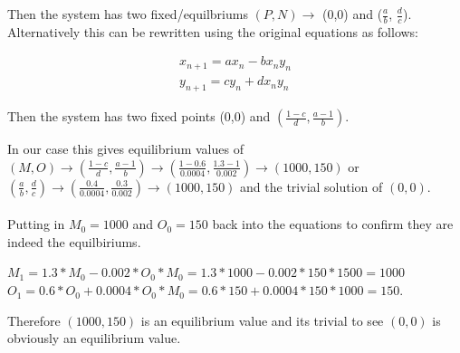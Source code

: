 \documentclass{article}
\begin{document}
\begin{enumerate}[1.]
\begin{enumerate}[(a)]
Then the system has two fixed/equilbriums $(P,N) \to$ (0,0) and ($\frac{a}{b}$, $\frac{d}{c}$). Alternatively this can be rewritten using the original equations as follows:

\begin{gather*}
x_{n+1} = ax_n-bx_ny_n \\
y_{n+1} = cy_n + dx_ny_n
\end{gather*}

Then the system has two fixed points (0,0) and $(\frac{1-c}{d},\frac{a-1}{b})$. 

In our case this gives equilibrium values of $(M,O) \to (\frac{1-c}{d},\frac{a-1}{b}) \to (\frac{1 - 0.6}{0.0004}, \frac{1.3 - 1}{0.002}) \to (1000, 150)$ or $(\frac{a}{b}, \frac{d}{c}) \to (\frac{0.4}{0.0004}, \frac{0.3}{0.002}) \to (1000, 150)$ and the trivial solution of $(0,0)$.  \\ \\

Putting in $M_0 = 1000$ and $O_0 = 150$ back into the equations to confirm they are indeed the equilbiriums.

$M_1 = 1.3 * M_0 - 0.002 * O_0 * M_0 = 1.3 * 1000 - 0.002 * 150 * 1500 = 1000$
$O_1 = 0.6 * O_0 + 0.0004 * O_0 * M_0 = 0.6 * 150 + 0.0004 * 150 * 1000 = 150$.

Therefore $(1000, 150)$ is an equilibrium value and its trivial to see $(0,0)$ is obviously an equilibrium value.


\end{enumerate}
\end{enumerate}
\end{document}

